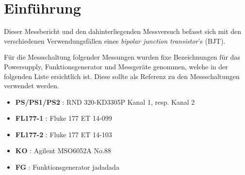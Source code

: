 \documentclass[../main.tex]{subfiles}
\begin{document}
\section{Einführung}



Dieser Messbericht und den dahinterliegenden Messversuch befasst sich mit den verschiedenen Verwendungsfällen eines \textit{bipolar junction transistor}'s (BJT).

Für die Messschaltung folgender Messungen wurden fixe Bezeichnungen für das Powersupply, Funktionsgenerator und Messgeräte genommen, welche in der folgenden Liste ersichtlich ist. Diese sollte als Referenz zu den Messschaltungen verwendet werden.

\begin{itemize}
    \item \textbf{PS/PS1/PS2} : RND 320-KD3305P Kanal 1, resp. Kanal 2
    \item \textbf{FL177-1} : Fluke 177 ET 14-099
    \item \textbf{FL177-2} : Fluke 177 ET 14-103
    \item \textbf{KO} : Agilent MSO6052A No.88
    \item \textbf{FG} : Funktionsgenerator jadadada
\end{itemize}
\end{document}
